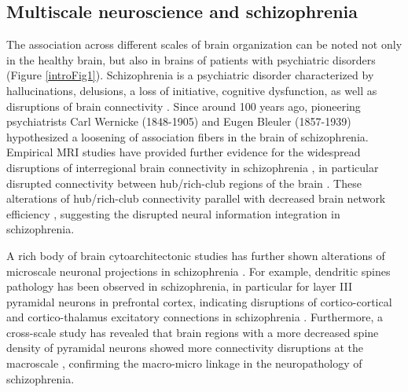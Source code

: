 \begin{refsection}
\subsection*{Multiscale neuroscience and schizophrenia}
The association across different scales of brain organization can be noted not only in the healthy brain, but also in brains of patients with psychiatric disorders (Figure \ref{introFig1}). Schizophrenia is a psychiatric disorder characterized by hallucinations, delusions, a loss of initiative, cognitive dysfunction, as well as disruptions of brain connectivity \citep{Stephan2009DysconnectionIS}. Since around 100 years ago, pioneering psychiatrists Carl Wernicke (1848-1905) and Eugen Bleuler (1857-1939) hypothesized a loosening of association fibers in the brain of schizophrenia. Empirical MRI studies have provided further evidence for the widespread disruptions of interregional brain connectivity in schizophrenia \citep{EllisonWright2009MetaanalysisOD,Klauser2017WhiteMD,Fitzsimmons2013ReviewOF}, in particular disrupted connectivity between hub/rich-club regions of the brain \citep{vanDenHeuvel2013AbnormalRC,Klauser2017WhiteMD}. These alterations of hub/rich-club connectivity parallel with decreased brain network efficiency \citep{Zalesky2011DisruptedAF}, suggesting the disrupted neural information integration in schizophrenia.

A rich body of brain cytoarchitectonic studies has further shown alterations of microscale neuronal projections in schizophrenia \citep{Bakhshi2015TheNO}. For example, dendritic spines pathology has been observed in schizophrenia, in particular for layer III pyramidal neurons in prefrontal cortex, indicating disruptions of cortico-cortical and cortico-thalamus excitatory connections in schizophrenia \citep{Glausier2013DendriticSP}. Furthermore, a cross-scale study has revealed that brain regions with a more decreased spine density of pyramidal neurons showed more connectivity disruptions at the macroscale \citep{VANDENHEUVEL2016293}, confirming the macro-micro linkage in the neuropathology of schizophrenia. 


\end{refsection}
